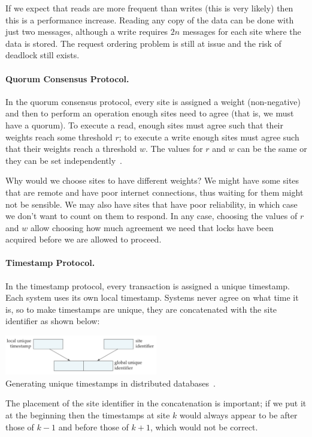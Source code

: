 If we expect that reads are more frequent than writes (this is very likely) then this is a performance increase. Reading any copy of the data can be done with just two messages, although a write requires $2n$ messages for each site where the data is stored. The request ordering problem is still at issue and the risk of deadlock still exists.

\paragraph{Quorum Consensus Protocol.} In the quorum consensus protocol, every site is assigned a weight (non-negative) and then to perform an operation enough sites need to agree (that is, we must have a quorum). To execute a read, enough sites must agree such that their weights reach some threshold $r$; to execute a write enough sites must agree such that their weights reach a threshold $w$. The values for $r$ and $w$ can be the same or they can be set independently~\cite{dsc}.

Why would we choose sites to have different weights? We might have some sites that are remote and have poor internet connections, thus waiting for them might not be sensible. We may also have sites that have poor reliability, in which case we don't want to count on them to respond. In any case, choosing the values of $r$ and $w$ allow choosing how much agreement we need that locks have been acquired before we are allowed to proceed.

\paragraph{Timestamp Protocol.} In the timestamp protocol, every transaction is assigned a unique timestamp. Each system uses its own local timestamp. Systems never agree on what time it is, so to make timestamps are unique, they are concatenated with the site identifier as shown below:

\begin{center}
\includegraphics[width=0.5\textwidth]{images/ddb-timestamp}\\
Generating unique timestamps in distributed databases~\cite{dsc}.
\end{center}

The placement of the site identifier in the concatenation is important; if we put it at the beginning then the timestamps at site $k$ would always appear to be after those of $k-1$ and before those of $k+1$, which would not be correct. 

